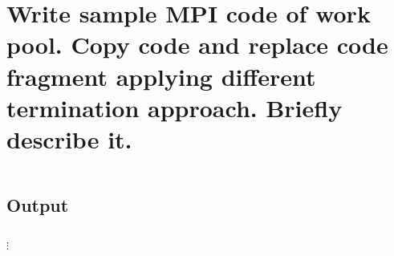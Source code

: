 \section{Write  sample MPI code of work pool. Copy code and replace code fragment applying different termination approach. Briefly describe it.}
\inputminted{c}{src/workpool.c}

\subsection*{Output}
\inputminted[firstline=0,lastline=50]{text}{src/output_workpool.txt}
$\vdots$
\inputminted[firstline=900,lastline=1010]{text}{src/output_workpool.txt}

